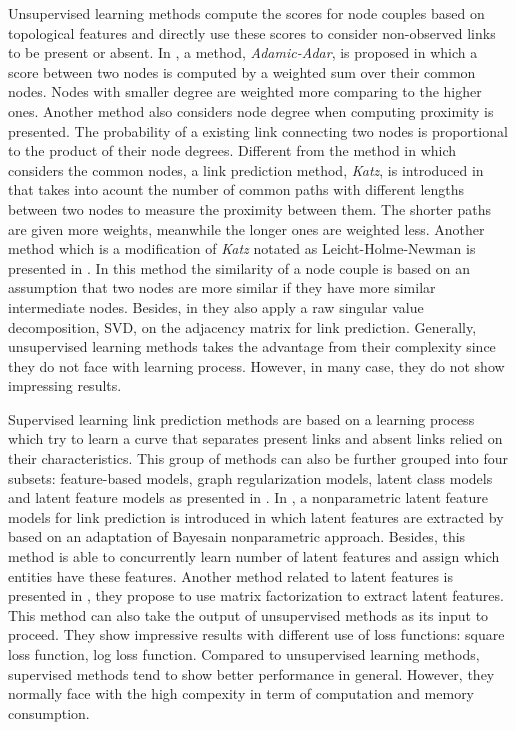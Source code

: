 \documentclass[runningheads,a4paper]{llncs}
\begin{document}
Unsupervised learning methods compute the scores for node couples based on topological features and directly use these scores to consider non-observed links to be present or absent. In \cite{adamic}, a method, \textit{Adamic-Adar}, is proposed in which a score between two nodes is computed by a weighted sum over their common nodes. Nodes with smaller degree are weighted more comparing to the higher ones. Another method also considers node degree when computing proximity is presented. The probability of a existing link connecting two nodes is proportional to the product of their node degrees. Different from the method in \cite{adamic} which considers the common nodes, a link prediction method, \textit{Katz}, is introduced in \cite{katz} that takes into acount the number of common paths with different lengths between two nodes to measure the proximity between them. The shorter paths are given more weights, meanwhile the longer ones are weighted less. Another method which is a modification of \textit{Katz} notated as Leicht-Holme-Newman is presented in \cite{lhni}. In this method the similarity of a node couple is based on an assumption that two nodes are more similar if they have more similar intermediate nodes. Besides, in \cite{matrix-factorization} they also apply a raw singular value decomposition, SVD, on the adjacency matrix for link prediction. Generally, unsupervised learning methods takes the advantage from their complexity since they do not face with learning process. However, in many case, they do not show impressing results.

Supervised learning link prediction methods are based on a learning process which try to learn a curve that separates present links and absent links relied on their characteristics. This group of methods can also be further grouped into four subsets: feature-based models, graph regularization models, latent class models and latent feature models as presented in \cite{matrix-factorization}. In \cite{nonparametric}, a nonparametric latent feature models for link prediction is introduced in which latent features are extracted by based on an adaptation of Bayesain nonparametric approach. Besides, this method is able to concurrently learn number of latent features and assign which entities have these features. Another method related to latent features is presented in \cite{matrix-factorization}, they propose to use matrix factorization to extract latent features. This method can also take the output of unsupervised methods as its input to proceed. They show impressive results with different use of loss functions: square loss function, log loss function. Compared to unsupervised learning methods, supervised methods tend to show better performance in general. However, they normally face with the high compexity in term of computation and memory consumption.
\end{document}

